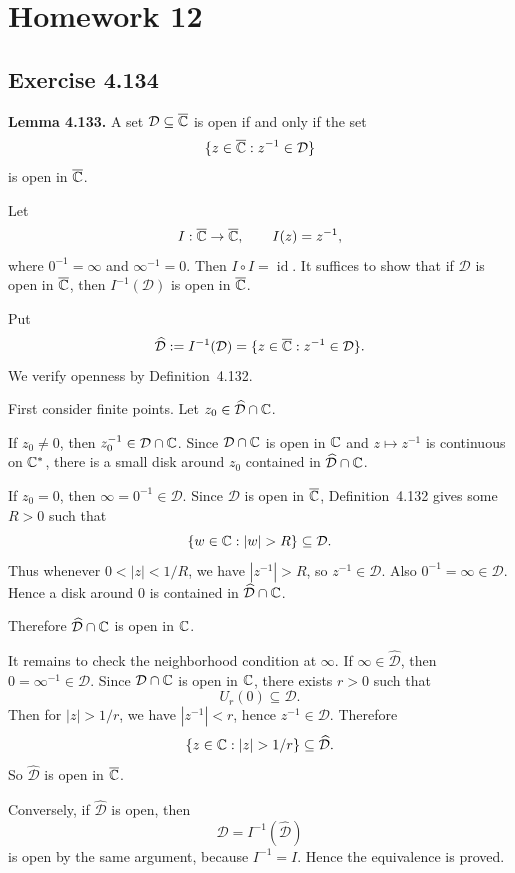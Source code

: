 \documentclass{article}
\providecommand{\Chat}{\overline{\C}}
\begin{document}
\section{Homework 12}

\subsection{Exercise 4.134}

\textbf{Lemma 4.133.}
A set $\mathcal D\subseteq \Chat$ is open if and only if the set
\[
  \{z\in\Chat:z^{-1}\in \mathcal D\}
\]
is open in $\Chat$.

\begin{solution}
  Let
  \[
    I:\Chat\to\Chat,\qquad I(z)=z^{-1},
  \]
  where $0^{-1}=\infty$ and $\infty^{-1}=0$. Then $I\circ I=\operatorname{id}$.
  It suffices to show that if $\mathcal D$ is open in $\Chat$, then
  $I^{-1}(\mathcal D)$ is open in $\Chat$.

  Put
  \[
    \widehat{\mathcal D}:=I^{-1}(\mathcal D)
    =\{z\in\Chat:z^{-1}\in\mathcal D\}.
  \]
  We verify openness by Definition~4.132.

  First consider finite points. Let $z_0\in \widehat{\mathcal D}\cap\mathbb{C}$.

  If $z_0\ne0$, then $z_0^{-1}\in \mathcal D\cap\mathbb{C}$. Since
  $\mathcal D\cap\mathbb{C}$ is open in $\mathbb{C}$ and $z\mapsto z^{-1}$ is continuous on
  $\mathbb{C}^\ast$, there is a small disk around $z_0$ contained in
  $\widehat{\mathcal D}\cap\mathbb{C}$.

  If $z_0=0$, then $\infty=0^{-1}\in\mathcal D$. Since $\mathcal D$ is open in
  $\Chat$, Definition~4.132 gives some $R>0$ such that
  \[
    \{w\in\C:|w|>R\}\subseteq \mathcal D.
  \]
  Thus whenever $0<|z|<1/R$, we have $|z^{-1}|>R$, so $z^{-1}\in\mathcal D$.
  Also $0^{-1}=\infty\in\mathcal D$. Hence a disk around $0$ is contained in
  $\widehat{\mathcal D}\cap\mathbb{C}$.

  Therefore $\widehat{\mathcal D}\cap\mathbb{C}$ is open in $\mathbb{C}$.

  It remains to check the neighborhood condition at $\infty$. If
  $\infty\in\widehat{\mathcal D}$, then $0=\infty^{-1}\in\mathcal D$. Since
  $\mathcal D\cap\mathbb{C}$ is open in $\mathbb{C}$, there exists $r>0$ such that
  \[
    U_r(0)\subseteq \mathcal D.
  \]
  Then for $|z|>1/r$, we have $|z^{-1}|<r$, hence $z^{-1}\in\mathcal D$.
  Therefore
  \[
    \{z\in\C:|z|>1/r\}\subseteq \widehat{\mathcal D}.
  \]
  So $\widehat{\mathcal D}$ is open in $\Chat$.

  Conversely, if $\widehat{\mathcal D}$ is open, then
  \[
    \mathcal D=I^{-1}(\widehat{\mathcal D})
  \]
  is open by the same argument, because $I^{-1}=I$. Hence the equivalence is
  proved.
\end{solution}
\end{document}
